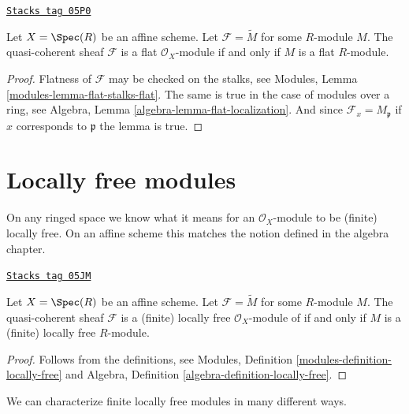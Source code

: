\begin{lemma}
\label{properties-lemma-flat-module}
\href{https://stacks.math.columbia.edu/tag/05P0}{\texttt{Stacks tag 05P0}}


Let $X = \Spec(R)$ be an affine scheme.
Let $\mathcal{F} = \widetilde{M}$ for some $R$-module $M$.
The quasi-coherent sheaf $\mathcal{F}$ is a flat
$\mathcal{O}_X$-module if and only if $M$ is a flat $R$-module.
\end{lemma}

\begin{proof}
Flatness of $\mathcal{F}$ may be checked on the stalks, see
Modules, Lemma \ref{modules-lemma-flat-stalks-flat}.
The same is true in the case of modules over a ring, see
Algebra, Lemma \ref{algebra-lemma-flat-localization}.
And since $\mathcal{F}_x = M_{\mathfrak p}$ if $x$ corresponds
to $\mathfrak p$ the lemma is true.
\end{proof}

\section{Locally free modules}
\label{properties-section-finite-locally-free}
On any ringed space we know what it means for an $\mathcal{O}_X$-module
to be (finite) locally free. On an affine scheme this matches the notion
defined in the algebra chapter.

\begin{lemma}
\label{properties-lemma-locally-free-module}
\href{https://stacks.math.columbia.edu/tag/05JM}{\texttt{Stacks tag 05JM}}

Let $X = \Spec(R)$ be an affine scheme.
Let $\mathcal{F} = \widetilde{M}$ for some $R$-module $M$.
The quasi-coherent sheaf $\mathcal{F}$ is a (finite) locally free
$\mathcal{O}_X$-module of if and only if $M$ is a (finite)
locally free $R$-module.
\end{lemma}

\begin{proof}
Follows from the definitions, see
Modules, Definition \ref{modules-definition-locally-free}
and
Algebra, Definition \ref{algebra-definition-locally-free}.
\end{proof}

We can characterize finite locally free modules in many different ways.

